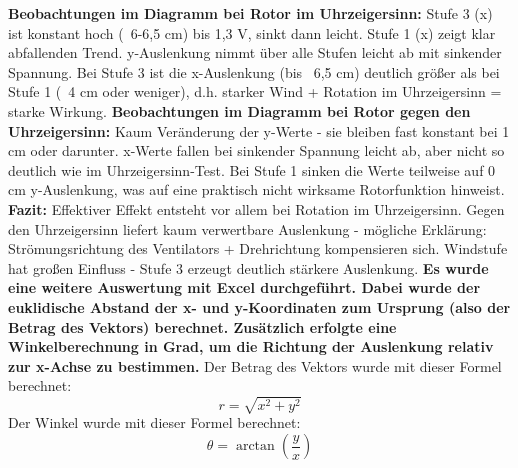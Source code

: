 \documentclass[a4paper,12pt]{article}
\begin{document}
\textbf{Beobachtungen im Diagramm bei Rotor im Uhrzeigersinn:}\newline
Stufe 3 (x) ist konstant hoch (~6-6,5 cm) bis 1,3 V, sinkt dann leicht.\newline
Stufe 1 (x) zeigt klar abfallenden Trend.\newline
y-Auslenkung nimmt über alle Stufen leicht ab mit sinkender Spannung.\newline
Bei Stufe 3 ist die x-Auslenkung (bis ~6,5 cm) deutlich größer als bei Stufe 1 (~4 cm oder weniger), d.h. starker Wind + Rotation im Uhrzeigersinn = starke Wirkung. \newline
\textbf{Beobachtungen im Diagramm bei Rotor gegen den Uhrzeigersinn:}\newline
Kaum Veränderung der y-Werte - sie bleiben fast konstant bei 1 cm oder darunter.\newline
x-Werte fallen bei sinkender Spannung leicht ab, aber nicht so deutlich wie im Uhrzeigersinn-Test.
\newpage
Bei Stufe 1 sinken die Werte teilweise auf 0 cm y-Auslenkung, was auf eine praktisch nicht wirksame Rotorfunktion hinweist. \newline
\textbf{Fazit:}\newline
Effektiver Effekt entsteht vor allem bei Rotation im Uhrzeigersinn.\newline
Gegen den Uhrzeigersinn liefert kaum verwertbare Auslenkung - mögliche Erklärung: Strömungsrichtung des Ventilators + Drehrichtung kompensieren sich.\newline
Windstufe hat großen Einfluss - Stufe 3 erzeugt deutlich stärkere Auslenkung.\newline \newline
\textbf{Es wurde eine weitere Auswertung mit Excel durchgeführt. Dabei wurde der euklidische Abstand der x- und y-Koordinaten zum Ursprung (also der Betrag des Vektors) berechnet. Zusätzlich erfolgte eine Winkelberechnung in Grad, um die Richtung der Auslenkung relativ zur x-Achse zu bestimmen.}\newline \newline
Der Betrag des Vektors wurde mit dieser Formel berechnet:
\begin{equation}
r = \sqrt{x^2 + y^2}
\end{equation} \newline
Der Winkel wurde mit dieser Formel berechnet: 
\begin{equation}
\theta = \arctan\left(\frac{y}{x}\right)
\end{equation}
\end{document}
